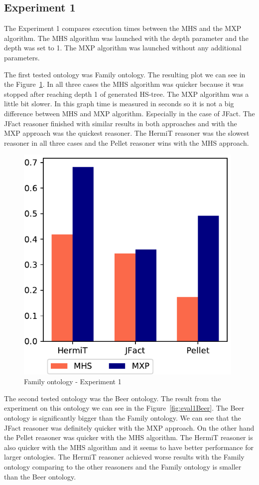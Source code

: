 \documentclass[12pt,a4paper]{article}
\begin{document}
\subsection{Experiment 1}

The Experiment 1 compares execution times between the MHS and the MXP algorithm. The MHS algorithm was launched with the depth parameter and the depth was set to 1. The MXP algorithm was launched without any additional parameters.

The first tested ontology was Family ontology. The resulting plot we can see in the  Figure~\ref{fig:eval1Family}. In all three cases the MHS algorithm was quicker because it was stopped after reaching depth 1 of generated HS-tree. The MXP algorithm was a little bit slower. In this graph time is measured in seconds so it is not a big difference between MHS and MXP algorithm. Especially in the case of JFact. The JFact reasoner finished with similar results in both approaches and with the MXP approach was the quickest reasoner. The HermiT reasoner was the slowest reasoner in all three cases and the Pellet reasoner wins with the MHS approach.

\begin{figure}[H]
	\centering
	\includegraphics[width=11cm]{eval1Family}
	\caption{Family ontology - Experiment 1}
	\label{fig:eval1Family}
\end{figure}

The second tested ontology was the Beer ontology. The result from the experiment on this ontology we can see in the Figure~\ref{fig:eval1Beer}. The Beer ontology is significantly bigger than the Family ontology. We can see that the JFact reasoner was definitely quicker with the MXP approach. On the other hand the Pellet reasoner was quicker with the MHS algorithm. The HermiT reasoner is also quicker with the MHS algorithm and it seems to have better performance for larger ontologies. The HermiT reasoner achieved worse results with the Family ontology comparing to the other reasoners and the Family ontology is smaller than the Beer ontology.
\end{document}
